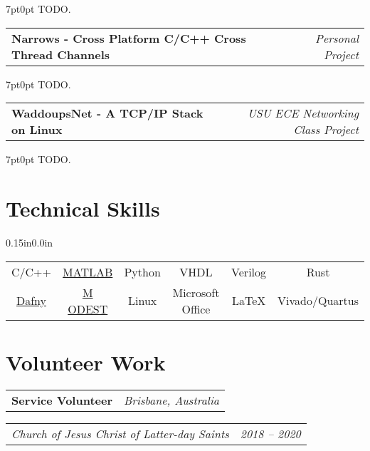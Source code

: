 \documentclass[letterpaper,12pt]{article}
\makeatletter
\def\fakesc#1{%
  \begingroup%
  \xdef\fake@name{\csname\curr@fontshape/\f@size\endcsname}%
  \fontsize{\fontdimen8\fake@name}{\baselineskip}\selectfont%
  \uppercase{#1}%
  \endgroup%
}
\newcommand{\simpleHeading}[2]{
    \vspace{-1pt}
    \begin{tabular*}{0.99\textwidth}[t]{l@{\extracolsep{\fill}}r}
        #1 & #2 \\
    \end{tabular*}
}
\newcommand{\positionHeading}[4]{
    \simpleHeading{\textbf{#1}}{\textit{#2}}
    \simpleHeading{\textit{#3}}{\textit{#4}}
}
\newcommand{\simpleParagraph}[1]{
    \vspace{-1pt}
    \begin{adjustwidth}{7pt}{0pt}
        #1
    \end{adjustwidth}
}
\makeatother
\begin{document}
    \simpleParagraph{TODO.}
    

    \vspace{10pt}
    \simpleHeading{\textbf{Narrows - Cross Platform C/C++ Cross Thread Channels}}{\textit{Personal Project}}

    \simpleParagraph{TODO.}
    
    \vspace{10pt}
    \simpleHeading{\textbf{WaddoupsNet - A TCP/IP Stack on Linux}}{\textit{USU ECE Networking Class Project}}

    \simpleParagraph{TODO.}


\section{Technical Skills}
  \begin{adjustwidth}{0.15in}{0.0in}
    \begin{tabular*}{0.97\linewidth}{@{\extracolsep{\fill}} cccccc }
        C/C++
            & \href{https://www.mathworks.com/products/matlab.html}{MATLAB}
            & Python & VHDL & Verilog & Rust \\
        \href{https://dafny.org/}{Dafny}
            & \href{https://www.modestchecker.net/}{M\fakesc{odest}}
            & Linux & Microsoft Office & \LaTeX & Vivado/Quartus \\
    \end{tabular*}
  \end{adjustwidth}


\section{Volunteer Work}
    \positionHeading{Service Volunteer}{Brisbane, Australia}
        {Church of Jesus Christ of Latter-day Saints}{2018 -- 2020}




\end{document}
